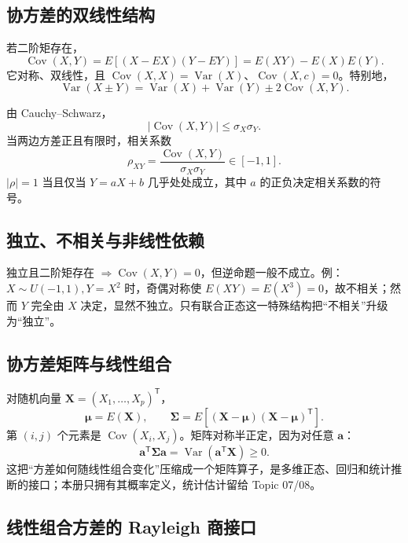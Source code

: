 \documentclass[11pt,a4paper]{ctexart}
\newenvironment{handbookdiagram}{\par\vspace{0.4em}\noindent\begin{center}}{\end{center}\vspace{0.4em}}
\begin{document}
\subsection{协方差的双线性结构}

若二阶矩存在，
\[
\operatorname{Cov}(X,Y)=E[(X-EX)(Y-EY)]=E(XY)-E(X)E(Y).
\]
它对称、双线性，且 $\operatorname{Cov}(X,X)=\operatorname{Var}(X)$、$\operatorname{Cov}(X,c)=0$。特别地，
\[
\operatorname{Var}(X\pm Y)=\operatorname{Var}(X)+\operatorname{Var}(Y)\pm2\operatorname{Cov}(X,Y).
\]

由 Cauchy--Schwarz，
\[
\lvert\operatorname{Cov}(X,Y)\rvert\leq\sigma_X\sigma_Y.
\]
当两边方差正且有限时，相关系数
\[
\rho_{XY}=\frac{\operatorname{Cov}(X,Y)}{\sigma_X\sigma_Y}\in[-1,1].
\]
$\lvert\rho\rvert=1$ 当且仅当 $Y=aX+b$ 几乎处处成立，其中 $a$ 的正负决定相关系数的符号。

\subsection{独立、不相关与非线性依赖}

独立且二阶矩存在 $\Rightarrow \operatorname{Cov}(X,Y)=0$，但逆命题一般不成立。例：$X\sim U(-1,1),Y=X^2$ 时，奇偶对称使 $E(XY)=E(X^3)=0$，故不相关；然而 $Y$ 完全由 $X$ 决定，显然不独立。只有联合正态这一特殊结构把“不相关”升级为“独立”。

\begin{handbookdiagram}
\resizebox{0.92\linewidth}{!}{%
%
}
\end{handbookdiagram}

\subsection{协方差矩阵与线性组合}

对随机向量 $\boldsymbol X=(X_1,\ldots,X_p)^{\mathsf T}$，
\[
\boldsymbol\mu=E(\boldsymbol X),\qquad
\boxed{\boldsymbol\Sigma=E[(\boldsymbol X-\boldsymbol\mu)(\boldsymbol X-\boldsymbol\mu)^{\mathsf T}]}.
\]
第 $(i,j)$ 个元素是 $\operatorname{Cov}(X_i,X_j)$。矩阵对称半正定，因为对任意 $\boldsymbol a$：
\[
\boldsymbol a^{\mathsf T}\boldsymbol\Sigma\boldsymbol a
=\operatorname{Var}(\boldsymbol a^{\mathsf T}\boldsymbol X)\geq0.
\]
这把“方差如何随线性组合变化”压缩成一个矩阵算子，是多维正态、回归和统计推断的接口；本册只拥有其概率定义，统计估计留给 Topic 07/08。

\subsection{线性组合方差的 Rayleigh 商接口}
\end{document}
